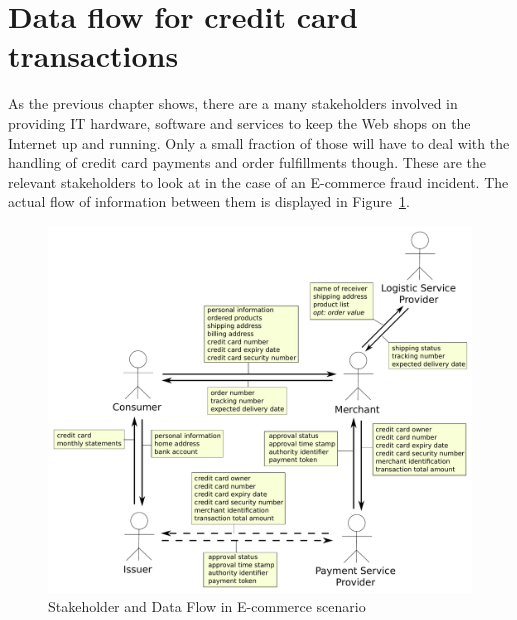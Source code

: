 
\section{Data flow for credit card transactions}
\label{sec:stakeholder_data_flow}

As the previous chapter shows, there are a many stakeholders involved in providing \gls{IT} hardware, software and services to keep the Web shops on the Internet up and running. Only a small fraction of those will have to deal with the handling of credit card payments and order fulfillments though. These are the relevant stakeholders to look at in the case of an \gls{E-commerce} fraud incident. The actual flow of information between them is displayed in  Figure~\ref{fig:images_e_commerce_stakeholder}. \@

\begin{figure}[H]
	\centering
		\includegraphics[width=0.9\columnwidth]{images/e-commerce-stakeholder.pdf}
	\caption{Stakeholder and Data Flow in \gls{E-commerce} scenario}
\label{fig:images_e_commerce_stakeholder}
\end{figure}
